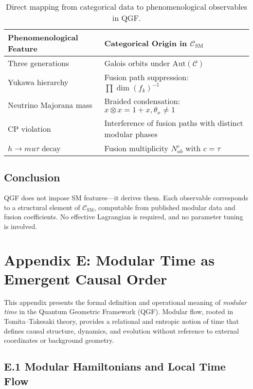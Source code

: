 \documentclass[11pt]{article}
\def\mu{mu}
\begin{document}
\begin{table}[H]
\centering
\renewcommand{\arraystretch}{1.25}
\begin{tabular}{|p{4.5cm}|p{7.5cm}|}
\hline
\textbf{Phenomenological Feature} & \textbf{Categorical Origin in \( \mathcal{C}_{\text{SM}} \)} \\
\hline
Three generations & Galois orbits under \( \text{Aut}(\mathcal{C}) \) \\
Yukawa hierarchy & Fusion path suppression: \( \prod \dim(f_k)^{-1} \) \\
Neutrino Majorana mass & Braided condensation: \( x \otimes x = 1 + x, \theta_x \neq 1 \) \\
CP violation & Interference of fusion paths with distinct modular phases \\
\( h \to \mu\tau \) decay & Fusion multiplicity \( N_{ab}^c \) with \( c = \tau \) \\
\hline
\end{tabular}
\caption{Direct mapping from categorical data to phenomenological observables in QGF.}
\label{tab:phenom-mapping}
\end{table}

\subsection*{Conclusion}

QGF does not impose SM features—it derives them. Each observable corresponds to a structural element of \( \mathcal{C}_{\text{SM}} \), computable from published modular data and fusion coefficients. No effective Lagrangian is required, and no parameter tuning is involved.



\section*{Appendix E: Modular Time as Emergent Causal Order}

This appendix presents the formal definition and operational meaning of \emph{modular time} in the Quantum Geometric Framework (QGF). Modular flow, rooted in Tomita–Takesaki theory, provides a relational and entropic notion of time that defines causal structure, dynamics, and evolution without reference to external coordinates or background geometry.

\subsection*{E.1 Modular Hamiltonians and Local Time Flow}
\end{document}
